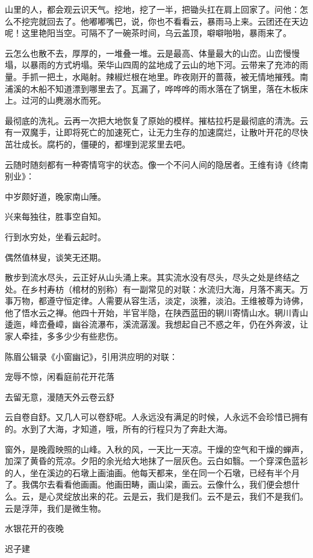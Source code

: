\documentclass{ctexart}
\newcommand{\blkx}{\vspace*{4\baselineskip} }
\renewcommand{\\}{\par}
\begin{document}
\\山里的人，都会观云识天气。挖地，挖了一半，把锄头扛在肩上回家了。问他：怎么不挖完就回去了。他嘟嘟嘴巴，说，你也不看看云，暴雨马上来。云团还在天边呢！这里艳阳当空。可隔不了一碗茶时间，乌云盖顶，噼噼啪啪，暴雨来了。
\\云怎么也散不去，厚厚的，一堆叠一堆。云是最高、体量最大的山峦。山峦慢慢塌，以暴雨的方式坍塌。荣华山四周的盆地成了云山的地下河。云带来了充沛的雨量。手抓一把土，水飚射。辣椒烂根在地里。昨夜刚开的蔷薇，被无情地摧残。南浦溪的木船不知道漂到哪里去了。瓦漏了，哗哗哗的雨水落在了锅里，落在木板床上。过河的山麂溺水而死。
\\最彻底的洗礼。云再一次把大地恢复了原始的模样。摧枯拉朽是最彻底的清洗。云有一双魔手，让即将死亡的加速死亡，让无力生存的加速腐烂，让散叶开花的尽快茁壮成长。腐朽的，僵硬的，都埋到泥浆里去吧。
\\云随时随刻都有一种寄情穹宇的状态。像一个不问人间的隐居者。王维有诗《终南别业》：
\\中岁颇好道，晚家南山陲。
\\兴来每独往，胜事空自知。
\\行到水穷处，坐看云起时。
\\偶然值林叟，谈笑无还期。
\\散步到流水尽头，云正好从山头涌上来。其实流水没有尽头，尽头之处是终结之处。在乡村寿枋（棺材的别称）有一副常见的对联：水流归大海，月落不离天。万事万物，都遵守恒定律。人需要从容生活，淡定，淡雅，淡泊。王维被尊为诗佛，他了悟水云之禅。他四十开始，半官半隐，在陕西蓝田的辋川寄情山水。辋川青山逶迤，峰峦叠嶂，幽谷流瀑布，溪流潺湲。我想起自己不惑之年，仍在外奔波，让家人牵挂，多多少少有些悲伤。
\\陈眉公辑录《小窗幽记》，引用洪应明的对联：
\\宠辱不惊，闲看庭前花开花落
\\去留无意，漫随天外云卷云舒
\\云自卷自舒。又几人可以卷舒呢。人永远没有满足的时候，人永远不会珍惜已拥有的。水到了大海，才知道，哦，所有的行程只为了奔赴大海。
\\窗外，是晚霞映照的山峰。入秋的风，一天比一天凉。干燥的空气和干燥的蝉声，加深了黄昏的荒凉。夕阳的余光给大地抹了一层灰色。云白如翳。一个穿深色蓝衫的人，坐在溪边的石墩上画油画。他每天都来，坐在同一个石墩，已经有半个月了。我偶尔去看看他画画。他画田畴，画山梁，画云。云像什么，我们便会想什么。云，是心灵绽放出来的花。云是云，我们是我们。云不是云，我们不是我们。云是浮萍，我们是微生物。
\blkx
\\\centerline{水银花开的夜晚}
\\\centerline{迟子建}
\end{document}
